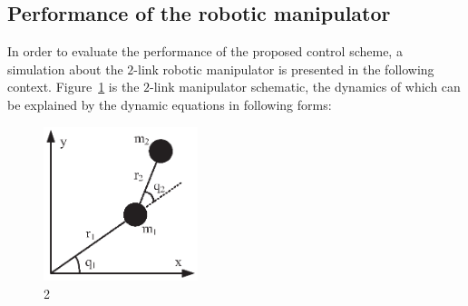 \documentclass[3p]{elsarticle}
\theoremstyle{plain}
\theoremstyle{remark}
\begin{document}
\subsection{Performance of the robotic manipulator}
In order to evaluate the performance of the proposed control scheme, a simulation about the $2$-link robotic manipulator is presented in the following context. Figure~\ref{Figure:1} is the $2$-link manipulator schematic, the dynamics of which can be explained by the dynamic equations in following forms:

\begin{figure}
\centering
\includegraphics[width=0.4\textwidth]{paper3_fig1.eps}
\caption{2}
\label{Figure:1}
\end{figure}
\end{document}
